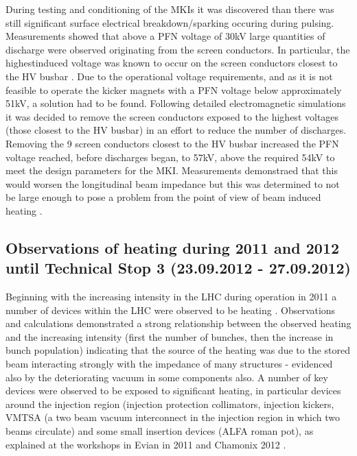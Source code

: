 During testing and conditioning of the MKIs it was discovered than there was still significant surface electrical breakdown/sparking occuring during pulsing. Measurements showed that above a PFN voltage of 30kV large quantities of discharge were observed originating from the screen conductors. In particular, the highestinduced  voltage was known to occur on the screen conductors closest to the HV busbar \cite{Barnes:improvBeamScreen}. Due to the operational voltage requirements, and as it is not feasible to operate the kicker magnets with a PFN voltage below approximately 51kV, a solution had to be found. Following detailed electromagnetic simulations it was decided to remove the screen conductors exposed to the highest voltages (those closest to the HV busbar) in an effort to reduce the number of discharges. Removing the 9 screen conductors closest to the HV busbar increased the PFN voltage reached, before discharges began, to 57kV, above the required 54kV to meet the design parameters for the MKI. Measurements demonstraed that this would worsen the longitudinal beam impedance but this was determined to not be large enough to pose a problem from the point of view of beam induced heating \cite{Barnes:improvBeamScreen}.

\subsection{Observations of heating during 2011 and 2012 until Technical Stop 3 (23.09.2012 - 27.09.2012)}

Beginning with the increasing intensity in the LHC during operation in 2011 a number of devices within the LHC were observed to be heating \cite{ Salvant:Heating, Metral:Heating}. Observations and calculations demonstrated a strong relationship between the observed heating and the increasing intensity (first the number of bunches, then the increase in bunch population) indicating that the source of the heating was due to the stored beam interacting strongly with the impedance of many structures - evidenced also by the deteriorating vacuum in some components also. A number of key devices were observed to be exposed to significant heating, in particular devices around the injection region (injection protection collimators, injection kickers, VMTSA (a two beam vacuum interconnect in the injection region in which two beams circulate) and some small insertion devices (ALFA roman pot), as explained at the workshops in Evian in 2011 \cite{Salvant:Heating} and Chamonix 2012 \cite{Metral:Heating}. 

